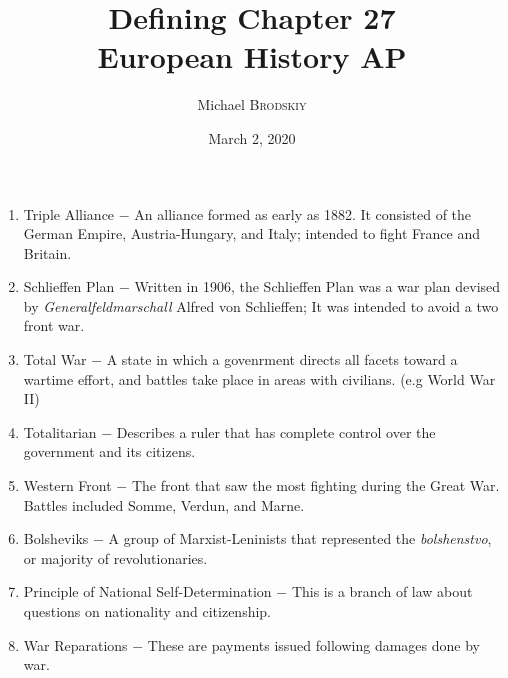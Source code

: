 \documentclass[12pt]{article}
\newcommand{\subtitle}[1]{%
  \posttitle{%
    \par\end{center}
    \begin{center}\large#1\end{center}
    \vskip0.5em}%
}
\begin{document}


\author{Michael \textsc{Brodskiy}}
\title{Defining Chapter 27 \\European History AP}
\subtitle{Mrs Fisher}
\date{March 2, 2020}
\maketitle



\begin{enumerate}


\item Triple Alliance $-$ An alliance formed as early as 1882. It consisted of the German Empire, Austria-Hungary, and Italy; intended to fight France and Britain.

\item Schlieffen Plan $-$ Written in 1906, the Schlieffen Plan was a war plan devised by \emph{Generalfeldmarschall} Alfred von Schlieffen; It was intended to avoid a two front war.

\item Total War $-$ A state in which a govenrment directs all facets toward a wartime effort, and battles take place in areas with civilians. (e.g World War II)

\item Totalitarian $-$  Describes a ruler that has complete control over the government and its citizens.

\item Western Front $-$ The front that saw the most fighting during the Great War. Battles included Somme, Verdun, and Marne.

\item Bolsheviks $-$ A group of Marxist-Leninists that represented the \emph{bolshenstvo}, or majority of revolutionaries.

\item Principle of National Self-Determination $-$ This is a branch of law about questions on nationality and citizenship.

\item War Reparations $-$ These are payments issued following damages done by war.


\end{enumerate}
\end{document}

